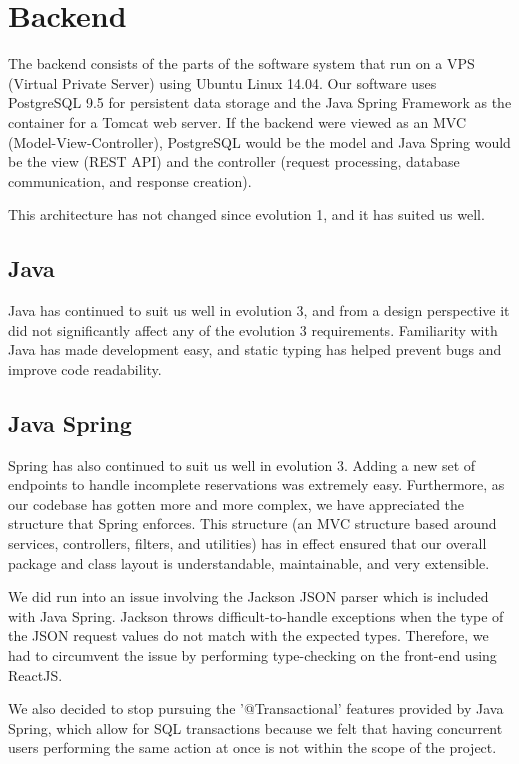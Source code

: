 \documentclass[12pt]{article}
\begin{document}
\section{Backend}

\label{sec:Backend}
The backend consists of the parts of the software system that run on a VPS (Virtual Private Server) using Ubuntu Linux 14.04. Our software uses PostgreSQL 9.5 for persistent data storage and the Java Spring Framework as the container for a Tomcat web server. If the backend were viewed as an MVC (Model-View-Controller), PostgreSQL would be the model and Java Spring would be the view (REST API) and the controller (request processing, database communication, and response creation). 

This architecture has not changed since evolution 1, and it has suited us well. 

\subsection{Java}
Java has continued to suit us well in evolution 3, and from a design perspective it did not significantly affect any of the evolution 3 requirements. Familiarity with Java has made development easy, and static typing has helped prevent bugs and improve code readability.

\subsection{Java Spring}
Spring has also continued to suit us well in evolution 3. Adding a new set of endpoints to handle incomplete reservations was extremely easy. Furthermore, as our codebase has gotten more and more complex, we have appreciated the structure that Spring enforces. This structure (an MVC structure based around services, controllers, filters, and utilities) has in effect ensured that our overall package and class layout is understandable, maintainable, and very extensible. 

We did run into an issue involving the Jackson JSON parser which is included with Java Spring. Jackson throws difficult-to-handle exceptions when the type of the JSON request values do not match with the expected types. Therefore, we had to circumvent the issue by performing type-checking on the front-end using ReactJS.

We also decided to stop pursuing the '@Transactional' features provided by Java Spring, which allow for SQL transactions because we felt that having concurrent users performing the same action at once is not within the scope of the project. 
\end{document}
